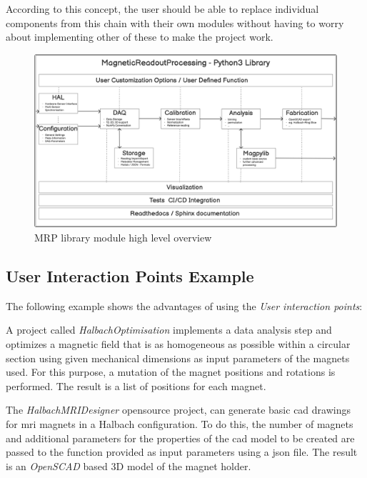 According to this concept, the user should be able to replace individual
components from this chain with their own modules without having to
worry about implementing other of these to make the project work.

\begin{figure}
\centering
\includegraphics{./generated_images/border_MRP_library_module_high_level_overview.png}
\caption{MRP library module high level overview
\label{MRP_library_module_high_level_overview.png}}
\end{figure}

\hypertarget{user-interaction-points-example}{%
\subsection{User Interaction Points
Example}\label{user-interaction-points-example}}

The following example shows the advantages of using the \emph{User
interaction points}:

A project called \emph{HalbachOptimisation}
\cite{HalbachOptimisation} implements a data analysis step and
optimizes a magnetic field that is as homogeneous as possible within a
circular section using given mechanical dimensions as input parameters
of the magnets used. For this purpose, a mutation of the magnet
positions and rotations is performed. The result is a list of positions
for each magnet.

The \emph{HalbachMRIDesigner} \cite{HalbachMRIDesigner} opensource
project, can generate basic \gls{cad} drawings for \gls{mri} magnets in
a Halbach configuration. To do this, the number of magnets and
additional parameters for the properties of the \gls{cad} model to be
created are passed to the function provided as input parameters using a
\gls{json} file. The result is an \emph{OpenSCAD} \cite{OpenSCAD}
based 3D model of the magnet holder.

